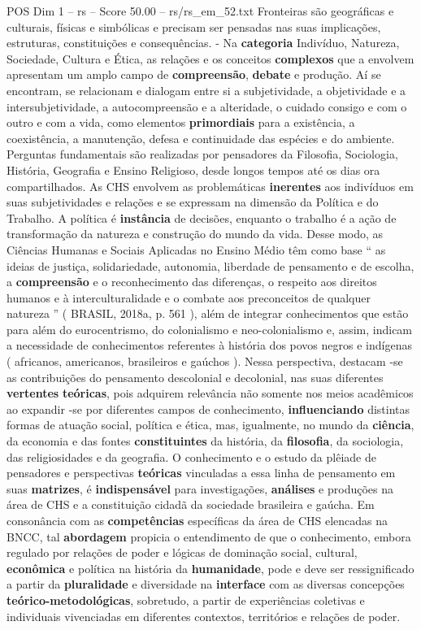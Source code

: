 \begin{textsample}{POS Dim 1 – rs – Score 50.00 – rs/rs\_em\_52.txt}
Fronteiras são geográficas e culturais, físicas e simbólicas e precisam ser pensadas nas suas implicações, estruturas, constituições e consequências. - Na \textbf{categoria} Indivíduo, Natureza, Sociedade, Cultura e Ética, as relações e os conceitos \textbf{complexos} que a envolvem apresentam um amplo campo de \textbf{compreensão}, \textbf{debate} e produção.
Aí se encontram, se relacionam e dialogam entre si a subjetividade, a objetividade e a intersubjetividade, a autocompreensão e a alteridade, o cuidado consigo e com o outro e com a vida, como elementos \textbf{primordiais} para a existência, a coexistência, a manutenção, defesa e continuidade das espécies e do ambiente.
Perguntas fundamentais são realizadas por pensadores da Filosofia, Sociologia, História, Geografia e Ensino Religioso, desde longos tempos até os dias ora compartilhados.
As CHS envolvem as problemáticas \textbf{inerentes} aos indivíduos em suas subjetividades e relações e se expressam na dimensão da Política e do Trabalho.
A política é \textbf{instância} de decisões, enquanto o trabalho é a ação de transformação da natureza e construção do mundo da vida.
Desse modo, as Ciências Humanas e Sociais Aplicadas no Ensino Médio têm como base “ as ideias de justiça, solidariedade, autonomia, liberdade de pensamento e de escolha, a \textbf{compreensão} e o reconhecimento das diferenças, o respeito aos direitos humanos e à interculturalidade e o combate aos preconceitos de qualquer natureza ” ( BRASIL, 2018a, p. 561 ), além de integrar conhecimentos que estão para além do eurocentrismo, do colonialismo e neo-colonialismo e, assim, indicam a necessidade de conhecimentos referentes à história dos povos negros e indígenas ( africanos, americanos, brasileiros e gaúchos ).
Nessa perspectiva, destacam -se as contribuições do pensamento descolonial e decolonial, nas suas diferentes \textbf{vertentes} \textbf{teóricas}, pois adquirem relevância não somente nos meios acadêmicos ao expandir -se por diferentes campos de conhecimento, \textbf{influenciando} distintas formas de atuação social, política e ética, mas, igualmente, no mundo da \textbf{ciência}, da economia e das fontes \textbf{constituintes} da história, da \textbf{filosofia}, da sociologia, das religiosidades e da geografia.
O conhecimento e o estudo da plêiade de pensadores e perspectivas \textbf{teóricas} vinculadas a essa linha de pensamento em suas \textbf{matrizes}, é \textbf{indispensável} para investigações, \textbf{análises} e produções na área de CHS e a constituição cidadã da sociedade brasileira e gaúcha.
Em consonância com as \textbf{competências} específicas da área de CHS elencadas na BNCC, tal \textbf{abordagem} propicia o entendimento de que o conhecimento, embora regulado por relações de poder e lógicas de dominação social, cultural, \textbf{econômica} e política na história da \textbf{humanidade}, pode e deve ser ressignificado a partir da \textbf{pluralidade} e diversidade na \textbf{interface} com as diversas concepções \textbf{teórico-metodológicas}, sobretudo, a partir de experiências coletivas e individuais vivenciadas em diferentes contextos, territórios e relações de poder.

\end{textsample}
